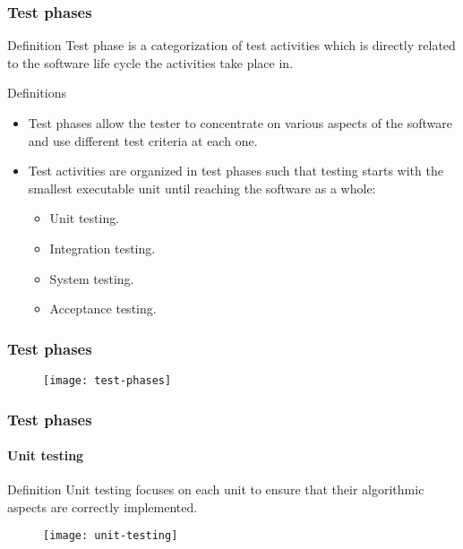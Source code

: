 \begin{frame}[parent={cmap:software-testing},hasnext=true,hasprev=true]
\frametitle{Test phases}
\label{concept:test-phase}

\begin{block:concept}{Definition}
Test phase is a categorization of test activities which is directly related
to the software life cycle the activities take place in.
\end{block:concept}

\begin{block:fact}{Definitions}
\begin{itemize}
	\item Test phases allow the tester to concentrate on various aspects of
	the software and use different test criteria at each one.

	\item Test activities are organized in test phases such that testing starts
	with the smallest executable unit until reaching the software as a whole:
	\begin{itemize}
		\item Unit testing.
		\item Integration testing.
		\item System testing.
		\item Acceptance testing.
	\end{itemize}
\end{itemize}
\end{block:fact}
\end{frame}


\begin{frame}[c]
\frametitle{Test phases}

\begin{figure}
    \centering
    \texttt{[image: test-phases]}
\end{figure}
\end{frame}


\begin{frame}
\label{concept:unit-testing}
\frametitle{Test phases}
\framesubtitle{Unit testing}

\begin{block:concept}{Definition}
Unit testing focuses on each unit to ensure that their algorithmic
aspects are correctly implemented.
\end{block:concept}

\begin{figure}
    \centering
    \texttt{[image: unit-testing]}
\end{figure}

\hfill
{}
\end{frame}


